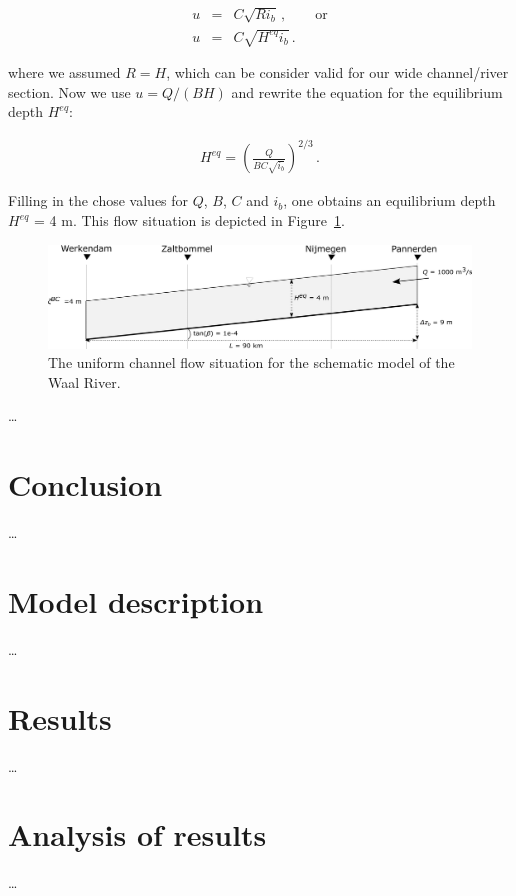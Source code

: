 \begin{eqnarray}
	u &=& C \sqrt{R i_b} \,, \qquad \textrm{or} \nonumber \\
	u &=& C \sqrt{H^{eq} i_b} \,.
\end{eqnarray}

where we assumed $R = H$, which can be consider valid for our wide channel/river section. Now we use $u = Q / (BH)$ and rewrite the equation for the equilibrium depth $H^{eq}$:

\begin{eqnarray}
	H^{eq} = \left( \frac{Q}{B C \sqrt{i_b}} \right)^{2/3} \,.
\end{eqnarray}

Filling in the chose values for $Q$, $B$, $C$ and $i_b$, one obtains an equilibrium depth $H^{eq}$ = 4 m.
This flow situation is depicted in Figure~\ref{fig:uniform_channel_flow}.

\begin{figure}[H]
    \centering
    \includegraphics*[width=\textwidth]{figures/uniform_channel_flow.png}
    \caption{The uniform channel flow situation for the schematic model of the Waal River.}
		\label{fig:uniform_channel_flow}
\end{figure}
\ldots

\section*{Conclusion} 
\ldots

\section*{Model description}
\ldots

\section*{Results}
\ldots

\section*{Analysis of results}
\ldots

\printrefsegment
